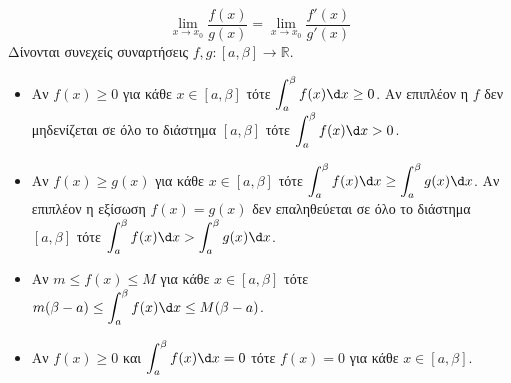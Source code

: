 \[ \lim\limits_{x\to x_0}{\frac{f(x)}{g(x)}}=\lim\limits_{x\to x_0}{\frac{f'(x)}{g'(x)}} \]
Δίνονται συνεχείς συναρτήσεις $f,g:[a,\beta]\to\mathbb{R}$.
\begin{itemize}
\item Αν $f(x)\geq 0$ για κάθε $x\in[a,\beta]$ τότε $\displaystyle\int_{a}^{\beta}{f(x)\d x}\geq 0$. Αν επιπλέον η $f$ δεν μηδενίζεται σε όλο το διάστημα $[a,\beta]$ τότε $\displaystyle\int_{a}^{\beta}{f(x)\d x}>0$.
\item Αν $f(x)\geq g(x)$ για κάθε $x\in[a,\beta]$ τότε $\displaystyle\int_{a}^{\beta}{f(x)\d x}\geq \int_{a}^{\beta}{g(x)\d x}$. Αν επιπλέον η εξίσωση $f(x)=g(x)$ δεν επαληθεύεται σε όλο το διάστημα $[a,\beta]$ τότε $\displaystyle\int_{a}^{\beta}{f(x)\d x}>\int_{a}^{\beta}{g(x)\d x}$.
\item Αν $m\leq f(x)\leq M$ για κάθε $x\in[a,\beta]$ τότε $m(\beta-a)\leq \displaystyle\int_{a}^{\beta}{f(x)\d x}\leq M(\beta-a)$.
\item Αν $f(x)\geq 0$ και $\displaystyle\int_{a}^{\beta}{f(x)\d x}=0$ τότε $f(x)=0$ για κάθε $x\in[a,\beta]$.
\end{itemize}